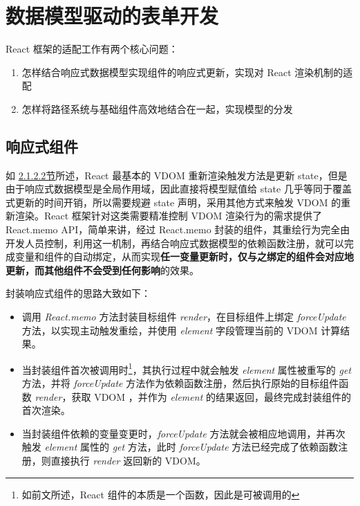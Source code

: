 \documentclass[winfonts,master,twoside]{njuthesis}
\begin{document}
\section{数据模型驱动的表单开发}

React 框架的适配工作有两个核心问题：

\begin{enumerate}
    \item 怎样结合响应式数据模型实现组件的响应式更新，实现对 React 渲染机制的适配
    \item 怎样将路径系统与基础组件高效地结合在一起，实现模型的分发
\end{enumerate}

\subsection{响应式组件}

如 \hyperref[react-framework]{2.1.2.2节}所述，React 最基本的 VDOM 重新渲染触发方法是更新 state，但是由于响应式数据模型是全局作用域，因此直接将模型赋值给 state 几乎等同于覆盖式更新的时间开销，所以需要规避 state 声明，采用其他方式来触发 VDOM 的重新渲染。React 框架针对这类需要精准控制 VDOM 渲染行为的需求提供了 React.memo API，简单来讲，经过 React.memo 封装的组件，其重绘行为完全由开发人员控制，利用这一机制，再结合响应式数据模型的依赖函数注册，就可以完成变量和组件的自动绑定，从而实现\textbf{任一变量更新时，仅与之绑定的组件会对应地更新，而其他组件不会受到任何影响}的效果。

封装响应式组件的思路大致如下：

\begin{itemize}
    \item 调用 \textit{React.memo} 方法封装目标组件 \textit{render}，在目标组件上绑定 \textit{forceUpdate} 方法，以实现主动触发重绘，并使用 \textit{element} 字段管理当前的 VDOM 计算结果。
    \item 当封装组件首次被调用时\footnote{如前文所述，React 组件的本质是一个函数，因此是可被调用的}，其执行过程中就会触发 \textit{element} 属性被重写的 \textit{get} 方法，并将 \textit{forceUpdate} 方法作为依赖函数注册，然后执行原始的目标组件函数 \textit{render}，获取 VDOM ，并作为 \textit{element} 的结果返回，最终完成封装组件的首次渲染。
    \item 当封装组件依赖的变量变更时，\textit{forceUpdate} 方法就会被相应地调用，并再次触发 \textit{element} 属性的 \textit{get} 方法，此时 \textit{forceUpdate} 方法已经完成了依赖函数注册，则直接执行 \textit{render} 返回新的 VDOM。
\end{itemize}
\end{document}
